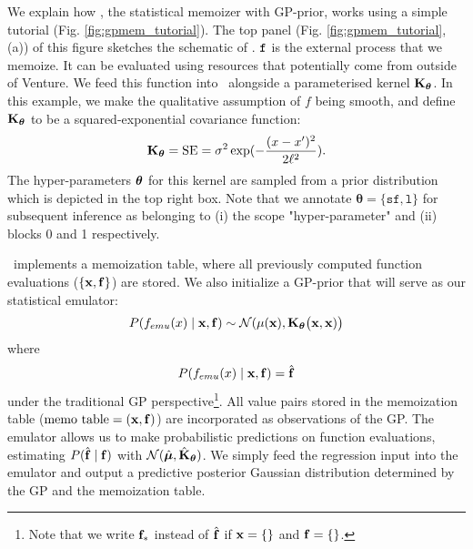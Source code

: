We explain how \gpmem, the statistical memoizer with \ac{GP}-prior, works using a simple tutorial
(Fig. \ref{fig:gpmem_tutorial}). 
The top panel (Fig. \ref{fig:gpmem_tutorial}, (a)) of this figure sketches the schematic of \gpmem.
$\texttt{f}$ is the external process that we memoize. It can be evaluated using resources that potentially come
from outside of Venture.  
We feed this function into \gpmem\ alongside
a parameterised kernel $\mathbf{K}_{\bm{\theta}}$.  
In this example, we make the qualitative assumption of $f$ being smooth, and define
$\mathbf{K}_{\bm{\theta}}$ to be a squared-exponential covariance function:
\[
\mathbf{K}_{\bm{\theta}} = \text{SE} = \sigma^2 \exp(-\frac{(x-x^\prime)^2}{2\ell^2}).
\]
The hyper-parameters $\bm{\theta}$ for this kernel are sampled from a 
prior distribution which is depicted in the top right box.
Note that we annotate $\bm{\theta}=\{\texttt{sf},\texttt{l}\}$ for subsequent
inference as belonging to (i) the scope "hyper-parameter" and (ii) blocks 0 and 1 respectively.

\gpmem\ implements a memoization table, where all previously
computed function evaluations ($\{\mathbf{x},\mathbf{f}\}$) are stored. We also initialize a \ac{GP}-prior that
will serve as our statistical emulator:
\[
P(f_{emu}(x) \mid \mathbf{x},\mathbf{f})\sim
\mathcal{N}(\mu(\mathbf{x}),\mathbf{K}_{\bm{\theta}}\big(\mathbf{x},\mathbf{x})\big)
\]
where 
\[
P(f_{emu}(x) \mid \mathbf{x},\mathbf{f}) = \hat{\mathbf{f}} 
\]
under the traditional \ac{GP} perspective\footnote{Note that we write $\mathbf{f}_*$ instead of $\hat{\mathbf{f}}$ if $\mathbf{x}=\{\}$ and $\mathbf{f}=\{\}$.}.
All value pairs stored in the memoization table ($\text{memo table} = (\mathbf{x},\mathbf{f})$) are incorporated as observations of
the \ac{GP}.
The emulator allows us to make probabilistic predictions on function evaluations, estimating
$P(\hat{\mathbf{f}}\mid \mathbf{f})$ with $\mathcal{N}(\hat{\bm{\mu}},\hat{\mathbf{K}}_{\bm{\theta}})$.
We simply feed the regression input
into the emulator and output a predictive posterior Gaussian distribution determined by the \ac{GP} and
the memoization table.

